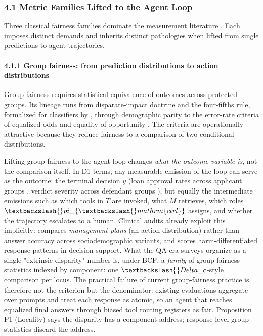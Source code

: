 \documentclass[10pt]{article}
\begin{document}
\subsubsection*{4.1 Metric Families Lifted to the Agent Loop}

Three classical fairness families dominate the measurement literature \cite{mehrabi2021survey,caton2024fairness,pessach2022review,barocas2023fairness}. Each imposes distinct demands and inherits distinct pathologies when lifted from single predictions to agent trajectories.

\paragraph*{4.1.1 Group fairness: from prediction distributions to action distributions}

Group fairness requires statistical equivalence of outcomes across protected groups. Its lineage runs from disparate-impact doctrine and the four-fifths rule, formalized for classifiers by \cite{feldman2015certifying}, through demographic parity to the error-rate criteria of equalized odds and equality of opportunity \cite{hardt2016equality}. The criteria are operationally attractive because they reduce fairness to a comparison of two conditional distributions.

Lifting group fairness to the agent loop changes \emph{what the outcome variable is}, not the comparison itself. In D1 terms, any measurable emission of the loop can serve as the outcome: the terminal decision $y$ (loan approval rates across applicant groups \cite{azime2025accept}, verdict severity across defendant groups \cite{hu2025llms}), but equally the intermediate emissions such as which tools in $T$ are invoked, what $M$ retrieves, which roles $\textbackslash\{\}pi\_\{\textbackslash\{\}mathrm\{ctrl\}\}$ assigns, and whether the trajectory escalates to a human. Clinical audits already exploit this implicitly: \cite{omar2025sociodemographic} compares \emph{management plans} (an action distribution) rather than answer accuracy across sociodemographic variants, and \cite{adappanavar2025mfarm} scores harm-differentiated response patterns in decision support. What the QA-era surveys organize as a single "extrinsic disparity" number \cite{gallegos2024bias,chu2024fairness} is, under BCF, a \emph{family} of group-fairness statistics indexed by component: one $\textbackslash\{\}Delta\_c$-style comparison per locus. The practical failure of current group-fairness practice is therefore not the criterion but the denominator: existing evaluations aggregate over prompts and treat each response as atomic, so an agent that reaches equalized final answers through biased tool routing registers as fair. Proposition P1 (Locality) says the disparity has a component address; response-level group statistics discard the address.
\end{document}
